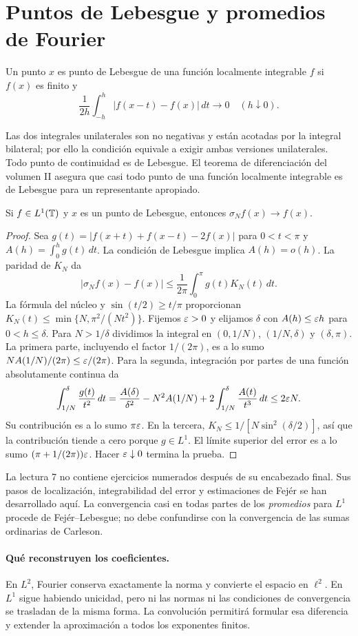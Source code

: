 \section{Puntos de Lebesgue y promedios de Fourier}
\begin{definicion}
Un punto $x$ es punto de Lebesgue de una función localmente integrable $f$ si $f(x)$ es finito y
\[
 \frac1{2h}\int_{-h}^h|f(x-t)-f(x)|\,dt\longrightarrow0\quad(h\downarrow0).
\]
\end{definicion}
Las dos integrales unilaterales son no negativas y están acotadas por la integral bilateral; por ello la condición equivale a exigir ambas versiones unilaterales. Todo punto de continuidad es de Lebesgue. El teorema de diferenciación del volumen II asegura que casi todo punto de una función localmente integrable es de Lebesgue para un representante apropiado.
\begin{teorema}\label{v4:fejer-lebesgue}
Si $f\in L^1(\mathbb T)$ y $x$ es un punto de Lebesgue, entonces $\sigma_Nf(x)\to f(x)$.
\end{teorema}
\begin{proof}
Sea $g(t)=|f(x+t)+f(x-t)-2f(x)|$ para $0<t<\pi$ y $A(h)=\int_0^hg(t)\,dt$. La condición de Lebesgue implica $A(h)=o(h)$. La paridad de $K_N$ da
\[
 |\sigma_Nf(x)-f(x)|\leq\frac1{2\pi}\int_0^\pi g(t)K_N(t)\,dt.
\]
La fórmula del núcleo y $\sin(t/2)\geq t/\pi$ proporcionan
$K_N(t)\leq\min\{N,\pi^2/(Nt^2)\}$.
Fijemos $\varepsilon>0$ y elijamos $\delta$ con $A(h)\leq\varepsilon h$ para $0<h\leq\delta$. Para $N>1/\delta$ dividimos la integral en $(0,1/N)$, $(1/N,\delta)$ y $(\delta,\pi)$. La primera parte, incluyendo el factor $1/(2\pi)$, es a lo sumo $NA(1/N)/(2\pi)\leq\varepsilon/(2\pi)$. Para la segunda, integración por partes de una función absolutamente continua da
\[
 \int_{1/N}^\delta\frac{g(t)}{t^2}\,dt
 =\frac{A(\delta)}{\delta^2}-N^2A(1/N)+2\int_{1/N}^\delta\frac{A(t)}{t^3}\,dt
 \leq2\varepsilon N.
\]
Su contribución es a lo sumo $\pi\varepsilon$. En la tercera, $K_N\leq1/[N\sin^2(\delta/2)]$, así que la contribución tiende a cero porque $g\in L^1$. El límite superior del error es a lo sumo $(\pi+1/(2\pi))\varepsilon$. Hacer $\varepsilon\downarrow0$ termina la prueba.
\end{proof}
La lectura 7 no contiene ejercicios numerados después de su encabezado final. Sus pasos de localización, integrabilidad del error y estimaciones de Fejér se han desarrollado aquí. La convergencia casi en todas partes de los \emph{promedios} para $L^1$ procede de Fejér--Lebesgue; no debe confundirse con la convergencia de las sumas ordinarias de Carleson.

\paragraph{Qué reconstruyen los coeficientes.}
En $L^2$, Fourier conserva exactamente la norma y convierte el espacio en $\ell^2$. En $L^1$ sigue habiendo unicidad, pero ni las normas ni las condiciones de convergencia se trasladan de la misma forma. La convolución permitirá formular esa diferencia y extender la aproximación a todos los exponentes finitos.
